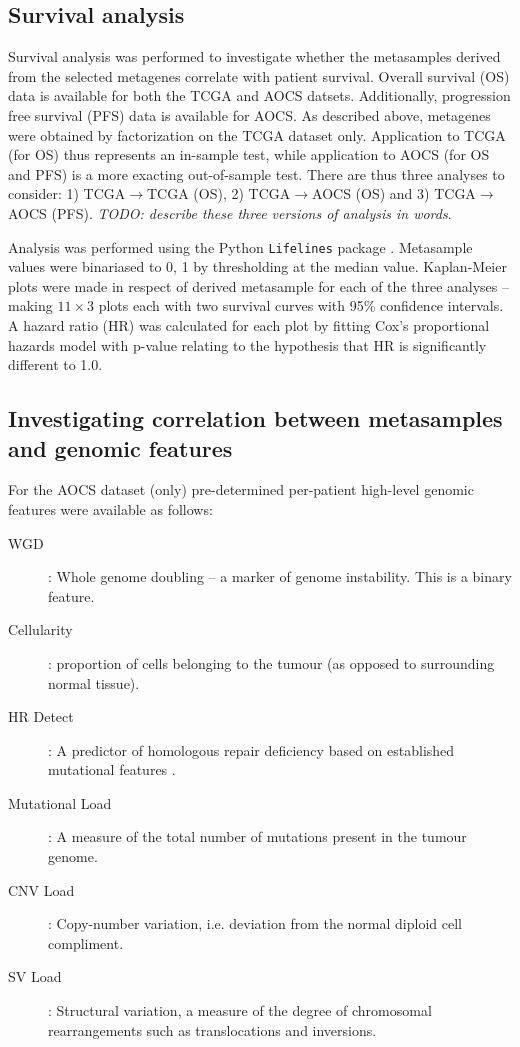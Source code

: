 \documentclass[draft,tikz, 12pt,a4paper,oneside,fleqn]{article}
\begin{document}
\subsection{Survival analysis}
\label{sec-survival-analysis}

Survival analysis was performed to investigate whether the metasamples derived from the selected metagenes correlate with patient survival.  Overall  survival (OS) data is available for both the TCGA and AOCS datsets.  Additionally, progression free survival (PFS) data is available for AOCS.   As described above,  metagenes were obtained by factorization on the TCGA dataset only.  Application to TCGA (for OS) thus represents an in-sample test, while application to AOCS (for OS and PFS) is a more exacting out-of-sample test. There are thus three analyses to consider: 1) TCGA$\rightarrow$TCGA (OS), 2) TCGA$\rightarrow$AOCS (OS) and 3) TCGA$\rightarrow$AOCS (PFS). \emph{TODO: describe these three versions of analysis in words}.

Analysis was performed using the Python {\tt Lifelines} package \cite{Davidson-Pilon2020}.  %
Metasample values were binariased to 0, 1 by thresholding at the median value.   Kaplan-Meier plots were made in respect of derived metasample for each of the three analyses -- making $11 \times 3$ plots each with two survival curves with 95\% confidence intervals.  A hazard ratio (HR)
was calculated for each plot by fitting Cox's proportional hazards model with p-value relating to the hypothesis that HR is significantly different to 1.0.


\subsection{Investigating correlation between metasamples and genomic features}
\label{sec-genomic-features}

For the AOCS dataset (only) pre-determined per-patient high-level genomic features were available as follows:
\begin{description}
\item[WGD]: Whole genome doubling -- a marker of genome instability.  This is a binary feature.
\item[Cellularity]: proportion of cells belonging to the tumour (as opposed to surrounding normal tissue).
\item[HR Detect]: A predictor of homologous repair deficiency based on established mutational features \cite{Ewing2020}.
\item[Mutational Load]: A measure of the total number of mutations present in the tumour genome.
\item[CNV Load]: Copy-number variation, i.e. deviation from the normal diploid cell compliment.
\item[SV Load]: Structural variation, a measure of the degree of chromosomal rearrangements such as translocations and inversions.
\end{description}
\end{document}
